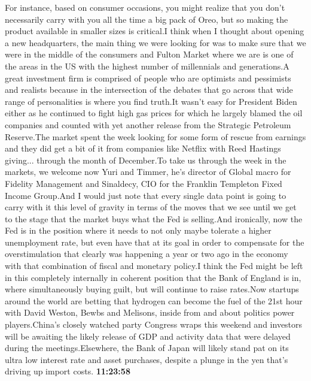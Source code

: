 \documentclass{article}%
\begin{document}
For instance, based on consumer occasions, you might realize that you don't necessarily carry with you all the time a big pack of Oreo, but so making the product available in smaller sizes is critical.I think when I thought about opening a new headquarters, the main thing we were looking for was to make sure that we were in the middle of the consumers and Fulton Market where we are is one of the areas in the US with the highest number of millennials and generations.A great investment firm is comprised of people who are optimists and pessimists and realists because in the intersection of the debates that go across that wide range of personalities is where you find truth.It wasn't easy for President Biden either as he continued to fight high gas prices for which he largely blamed the oil companies and counted with yet another release from the Strategic Petroleum Reserve.The market spent the week looking for some form of rescue from earnings and they did get a bit of it from companies like Netflix with Reed Hastings giving...  through the month of December.To take us through the week in the markets, we welcome now Yuri and Timmer, he's director of Global macro for Fidelity Management and Sinaldecy, CIO for the Franklin Templeton Fixed Income Group.And I would just note that every single data point is going to carry with it this level of gravity in terms of the moves that we see until we get to the stage that the market buys what the Fed is selling.And ironically, now the Fed is in the position where it needs to not only maybe tolerate a higher unemployment rate, but even have that at its goal in order to compensate for the overstimulation that clearly was happening a year or two ago in the economy with that combination of fiscal and monetary policy.I think the Fed might be left in this completely internally in coherent position that the Bank of England is in, where simultaneously buying guilt, but will continue to raise rates.Now startups around the world are betting that hydrogen can become the fuel of the 21st hour with David Weston, Bewbs and Melisons, inside from and about politics power players.China's closely watched party Congress wraps this weekend and investors will be awaiting the likely release of GDP and activity data that were delayed during the meetings.Elsewhere, the Bank of Japan will likely stand pat on its ultra low interest rate and asset purchases, despite a plunge in the yen that's driving up import costs.%
\textbf{11:23:58}%
\end{document}
